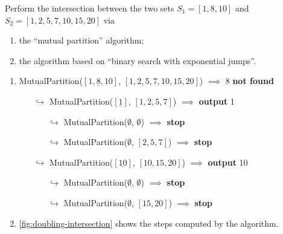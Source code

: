 \exercise

Perform the intersection between the two sets $S_1 = [1, 8, 10]$ and $S_2 = [1,
2, 5, 7, 10, 15, 20]$ via
%
\begin{enumerate}
  \item the ``mutual partition'' algorithm;
  \item the algorithm based on ``binary search with exponential jumps''.
\end{enumerate}

\solution

\begin{enumerate}
  \item {\sc MutualPartition($[1, \underline{8}, 10]$, $[1, 2, 5, 7, 10, 15, 20]$)} $\implies$ 8 {\bf not found}
    \begin{itemize}[topsep=-0.1em]
      \item[$\hookrightarrow$] {\sc MutualPartition($[\underline{1}]$, $[1, 2, 5, 7]$)} $\implies$ {\bf output} 1
        \begin{itemize}
          \item[$\hookrightarrow$] {\sc MutualPartition($\emptyset$, $\emptyset$)} $\implies$ {\bf stop}
          \item[$\hookrightarrow$] {\sc MutualPartition($\emptyset$, $[2, 5, 7]$)} $\implies$ {\bf stop}
        \end{itemize}
      \item[$\hookrightarrow$] {\sc MutualPartition($[\underline{10}]$, $[10, 15, 20]$)} $\implies$ {\bf output} 10
        \begin{itemize}
          \item[$\hookrightarrow$] {\sc MutualPartition($\emptyset$, $\emptyset$)} $\implies$ {\bf stop}
          \item[$\hookrightarrow$] {\sc MutualPartition($\emptyset$, $[15, 20]$)} $\implies$ {\bf stop}
        \end{itemize}
    \end{itemize}

  \item \autoref{fig:doubling-intersection} shows the steps computed by the
  algorithm.
  \begin{figure}[t]
    \begin{subfigure}{\linewidth}
      \centering
      \begin{tikzpicture}[
          node distance=0.8cm,
          every node/.append style={
            draw,rectangle,
            minimum width=0.8cm,
            minimum height=0.8cm,
            inner sep=0
          }
        ]


\end{tikzpicture}
\end{subfigure}
\end{figure}
\end{enumerate}
